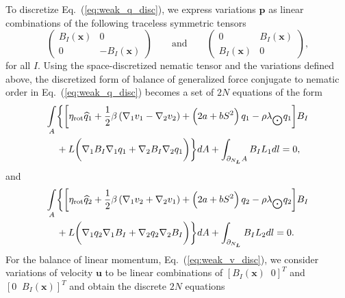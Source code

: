 To discretize Eq.~(\ref{eq:weak_q_disc}), we express variations $\bm{p}$ as linear combinations of the following traceless symmetric tensors 
\begin{equation}
	\begin{pmatrix}
		B_I(\bm{x}) & 0\\
		0 & -B_I(\bm{x})
	\end{pmatrix} \qquad \mbox{and} \qquad  \begin{pmatrix}
		0 & B_I(\bm{x})\\
		B_I(\bm{x}) & 0
	\end{pmatrix},
\end{equation}
for all $I$.  Using the space-discretized nematic tensor and the variations defined above, the discretized form of balance of generalized force conjugate to nematic order in Eq.~(\ref{eq:weak_q_disc}) becomes a set of $2N$  equations of the form 
\begin{align} \label{eq_week_1}
	\underset{A}{\int}  & \bigg\{ \bigg[ 	 \eta_{\rm rot} \widehat{q}_1 +  \frac{1}{2} \beta \left(\nabla_1 v_1 - \nabla_2 v_2 \right)+ \left(2a+bS^{2} \right)q_1 - \rho \lambda_{\bigodot} q_1 \bigg]B_I  \\ & +  
	L  \bigg(\nabla_1 B_I \nabla_1 q_1  \nonumber  +   \nabla_2 B_I \nabla_2 q_1 \bigg) \bigg \}   d A + \int_{\partial_{N_{\bm{L}}} A }  B_I L_1  dl =0, 
\end{align} 
and
\begin{align}  \label{eq_week_2}
	\underset{A}{\int}   & \bigg\{ \bigg[   \eta_{\rm rot} \widehat{q}_{2} +    \frac{1}{2}\beta \left(\nabla_1 v_2+ \nabla_2 v_1\right)+    \left(2a+bS^2\right)q_2 - \rho \lambda_{\bigodot} q_2 \bigg]B_I \\ & +   
	L \bigg( \nabla_1 q_2  \nabla_1 B_I+ \nonumber   \nabla_2 q_2 \nabla_2 B_I  \bigg) \bigg\}   dA  + \int_{\partial_{N_{\bm{L}}}}    B_I L_2   dl =0.
\end{align}
For the balance of linear momentum, Eq.~(\ref{eq:weak_v_disc}), we consider variations of velocity $\bm{u}$ to be linear combinations of $[B_I(\bm{x})\;\; 0]^T$ and $[0\;\; B_I(\bm{x})]^T$ and obtain the discrete $2N$ equations
